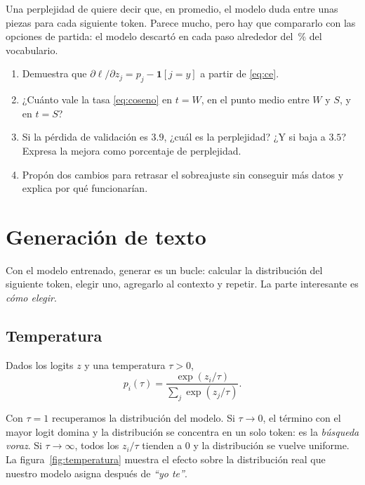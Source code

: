 \documentclass[11pt,letterpaper,oneside]{report}
\begin{document}
\begin{intuicion}
Una perplejidad de \mgMejorPPL{} quiere decir que, en promedio, el modelo duda entre unas \mgMejorPPL{} piezas para cada siguiente token. Parece mucho, pero hay que compararlo con las \mgVocab{} opciones de partida: el modelo descartó en cada paso alrededor del \mgDescartado\,\% del vocabulario.
\end{intuicion}

\begin{ejercicio}
\begin{enumerate}[label=\alph*)]
  \item Demuestra que $\partial\ell/\partial z_j = p_j - \mathbf{1}[j=y]$ a partir de \eqref{eq:ce}.
  \item ¿Cuánto vale la tasa \eqref{eq:coseno} en $t = W$, en el punto medio entre $W$ y $S$, y en $t = S$?
  \item Si la pérdida de validación es $3.9$, ¿cuál es la perplejidad? ¿Y si baja a $3.5$? Expresa la mejora como porcentaje de perplejidad.
  \item Propón dos cambios para retrasar el sobreajuste sin conseguir más datos y explica por qué funcionarían.
\end{enumerate}
\end{ejercicio}

\section{Generación de texto}\label{sec:generacion}

Con el modelo entrenado, generar es un bucle: calcular la distribución del siguiente token, elegir uno, agregarlo al contexto y repetir. La parte interesante es \emph{cómo elegir}.

\subsection{Temperatura}

\begin{definicion}
Dados los logits $z$ y una temperatura $\tau > 0$,
\[
  p_i(\tau) = \frac{\exp(z_i/\tau)}{\sum_{j}\exp(z_j/\tau)} .
\]
\end{definicion}
Con $\tau = 1$ recuperamos la distribución del modelo. Si $\tau\to 0$, el término con el mayor logit domina y la distribución se concentra en un solo token: es la \emph{búsqueda voraz}. Si $\tau\to\infty$, todos los $z_i/\tau$ tienden a $0$ y la distribución se vuelve uniforme. La figura~\ref{fig:temperatura} muestra el efecto sobre la distribución real que nuestro modelo asigna después de \emph{``yo te''}.
\end{document}
